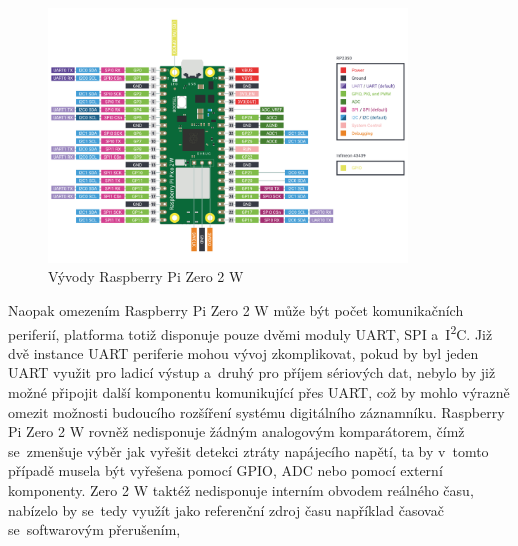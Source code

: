\begin{figure}[h]
    \centering
    \includegraphics[width=0.85\textwidth]{obrazky-figures/pico2w-pinout.pdf}
    
    \caption{Vývody Raspberry Pi Zero 2 W~\cite{raspberry_pi_pico_2w}}
    \label{fig:raspberry-pi-zero-2w}
\end{figure}

Naopak omezením Raspberry Pi Zero 2 W může být počet komunikačních periferií, platforma totiž disponuje pouze dvěmi moduly UART, SPI a~I\textsuperscript{2}C. Již dvě instance UART periferie mohou vývoj zkomplikovat, pokud by byl jeden UART využit pro ladicí výstup a~druhý pro příjem sériových dat, nebylo by již možné připojit další komponentu komunikující přes UART, což by mohlo výrazně omezit možnosti budoucího rozšíření systému digitálního záznamníku. Raspberry Pi Zero 2 W rovněž nedisponuje žádným analogovým komparátorem, čímž se~zmenšuje výběr jak vyřešit detekci ztráty napájecího napětí, ta by v~tomto případě musela být vyřešena pomocí GPIO, ADC nebo pomocí externí komponenty. Zero 2 W taktéž nedisponuje interním obvodem reálného času, nabízelo by se~tedy využít jako referenční zdroj času například časovač se~softwarovým přerušením,~\cite{raspberry_pi_pico_2w}


